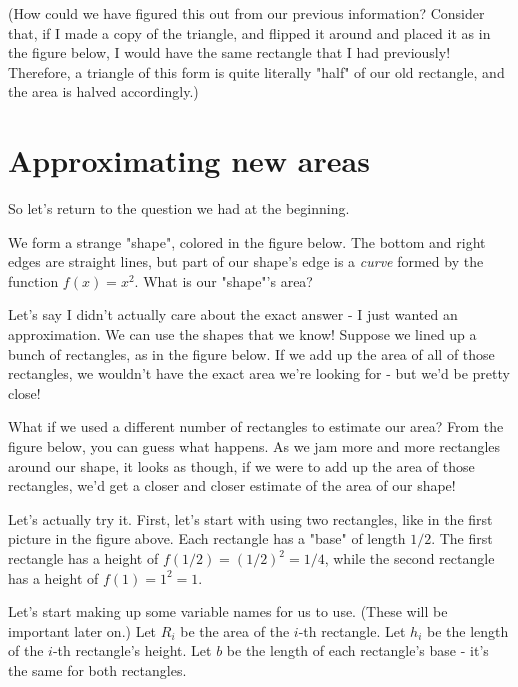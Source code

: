 \documentclass{book}
\begin{document}
(How could we have figured this out from our previous information? Consider that, if I made a copy of the triangle, and flipped it around and placed it as in the figure below,  I would have the same rectangle that I had previously! Therefore, a triangle of this form is quite literally "half" of our old rectangle, and the area is halved accordingly.)



\section{Approximating new areas}

So let's return to the question we had at the beginning.

We form a strange "shape", colored in the figure below. The bottom and right edges are straight lines, but part of our shape's edge is a \textit{curve} formed by the function $f(x) = x^2$. What is our "shape"'s area?



Let's say I didn't actually care about the exact answer - I just wanted an approximation. We can use the shapes that we know! Suppose we lined up a bunch of rectangles, as in the figure below. If we add up the area of all of those rectangles, we wouldn't have the exact area we're looking for - but we'd be pretty close!



What if we used a different number of rectangles to estimate our area? From the figure below, you can guess what happens. As we jam more and more rectangles around our shape, it looks as though, if we were to add up the area of those rectangles, we'd get a closer and closer estimate of the area of our shape!


Let's actually try it. First, let's start with using two rectangles, like in the first picture in the figure above. Each rectangle has a "base" of length $1/2$. The first rectangle has a height of $f(1/2) = (1/2)^2 = 1/4$, while the second rectangle has a height of $f(1) = 1^2 = 1$. 

Let's start making up some variable names for us to use. (These will be important later on.) Let $R_{i}$ be the area of the $i$-th rectangle. Let $h_{i}$ be the length of the $i$-th rectangle's height. Let $b$ be the length of each rectangle's base - it's the same for both rectangles.
\end{document}
